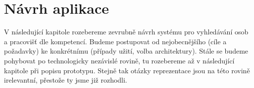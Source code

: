 \chapter{Návrh aplikace} \label{chap:app-design}
V následující kapitole rozebereme zevrubně návrh systému pro vyhledávání osob a pracovišť dle kompetencí. Budeme postupovat od nejobecnějšího (cíle a požadavky) ke konkrétnímu (případy užití, volba architektury). Stále se budeme pohybovat po technologicky nezávislé rovině, tu rozebereme až v následující kapitole při popisu prototypu. Stejně tak otázky reprezentace jsou na této rovině irelevantní, přestože ty jsme již rozhodli.


